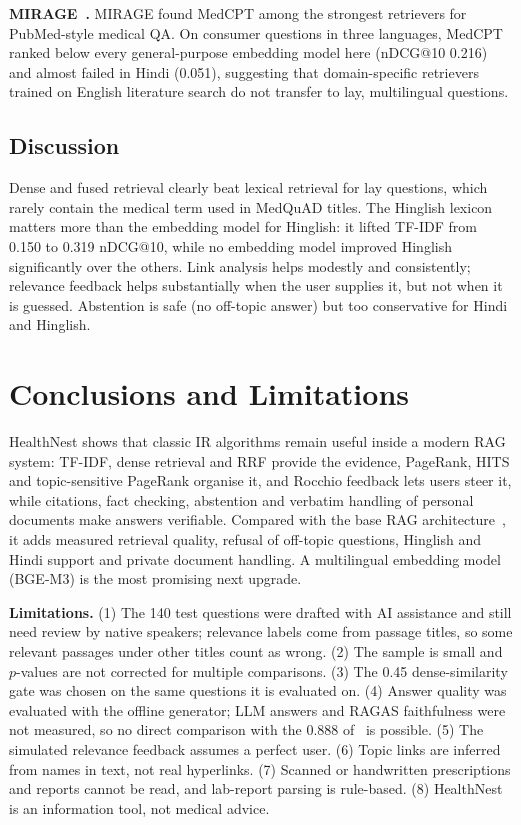 \documentclass[conference]{IEEEtran}
\begin{document}
\textbf{MIRAGE~\cite{xiong2024}.} MIRAGE found MedCPT among the strongest retrievers for PubMed-style medical QA. On consumer questions in three languages, MedCPT ranked below every general-purpose embedding model here (nDCG@10 0.216) and almost failed in Hindi (0.051), suggesting that domain-specific retrievers trained on English literature search do not transfer to lay, multilingual questions.

\subsection{Discussion}
Dense and fused retrieval clearly beat lexical retrieval for lay questions, which rarely contain the medical term used in MedQuAD titles. The Hinglish lexicon matters more than the embedding model for Hinglish: it lifted TF-IDF from 0.150 to 0.319 nDCG@10, while no embedding model improved Hinglish significantly over the others. Link analysis helps modestly and consistently; relevance feedback helps substantially when the user supplies it, but not when it is guessed. Abstention is safe (no off-topic answer) but too conservative for Hindi and Hinglish.

\section{Conclusions and Limitations}
HealthNest shows that classic IR algorithms remain useful inside a modern RAG system: TF-IDF, dense retrieval and RRF provide the evidence, PageRank, HITS and topic-sensitive PageRank organise it, and Rocchio feedback lets users steer it, while citations, fact checking, abstention and verbatim handling of personal documents make answers verifiable. Compared with the base RAG architecture~\cite{fedallah2026}, it adds measured retrieval quality, refusal of off-topic questions, Hinglish and Hindi support and private document handling. A multilingual embedding model (BGE-M3) is the most promising next upgrade.

\textbf{Limitations.} (1) The 140 test questions were drafted with AI assistance and still need review by native speakers; relevance labels come from passage titles, so some relevant passages under other titles count as wrong. (2) The sample is small and $p$-values are not corrected for multiple comparisons. (3) The 0.45 dense-similarity gate was chosen on the same questions it is evaluated on. (4) Answer quality was evaluated with the offline generator; LLM answers and RAGAS faithfulness were not measured, so no direct comparison with the 0.888 of~\cite{fedallah2026} is possible. (5) The simulated relevance feedback assumes a perfect user. (6) Topic links are inferred from names in text, not real hyperlinks. (7) Scanned or handwritten prescriptions and reports cannot be read, and lab-report parsing is rule-based. (8) HealthNest is an information tool, not medical advice.
\end{document}
